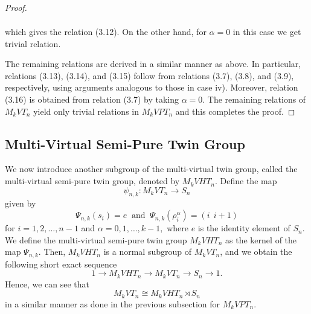 \documentclass[preprint]{elsarticle}
\begin{document}
\begin{proof}
\begin{itemize}
\begin{align*}
       \end{align*}
       which gives the relation (3.12). On the other hand, for $\alpha =0$ in this case we get trivial relation.
    \end{itemize}
   The remaining relations are derived in a similar manner as above. In particular, relations (3.13), (3.14), and (3.15) follow from relations (3.7), (3.8), and (3.9), respectively, using arguments analogous to those in case iv). Moreover, relation (3.16) is obtained from relation (3.7) by taking $\alpha = 0$. The remaining relations of $M_kVT_n$ yield only trivial relations in $M_kVPT_n$ and this completes the proof.
   \end{proof}

\subsection{Multi-Virtual Semi-Pure Twin Group}

We now introduce another subgroup of the multi-virtual twin group, called the multi-virtual semi-pure twin group, denoted by \(M_kVHT_n\). Define the map $$\psi_{n,k}: M_kVT_n \longrightarrow S_n $$ given by \[ \Psi_{n,k}(s_i)=e \ \text{ and }\  \Psi_{n,k}(\rho_i^{\alpha})=(i \ \ i+1) \]
for $i=1,2,\dots,n-1$ and $\alpha = 0,1,\dots,k-1,$ where $e$ is the identity element of $S_n$. We define the multi-virtual semi-pure twin group \(M_kVHT_n\) as the kernel of the map $\Psi_{n,k}$. Then, $M_kVHT_n$ is a normal subgroup of $M_kVT_n$, and we obtain the following short exact sequence
\[
1 \longrightarrow M_kVHT_n \longrightarrow M_kVT_n \longrightarrow S_n \longrightarrow 1.
\] 
Hence, we can see that $$M_kVT_n \cong M_kVHT_n \rtimes S_n$$ in a similar manner as done in the previous subsection for $M_kVPT_n$.
\end{document}
